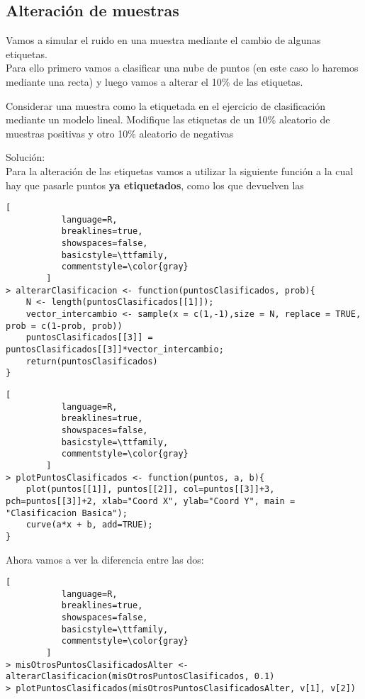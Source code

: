 \documentclass[11pt,fleqn]{book} %
\begin{document}
\subsection{Alteración de muestras}
Vamos a simular el ruido en una muestra mediante el cambio de algunas etiquetas.\\
Para ello primero vamos a clasificar una nube de puntos (en este caso lo haremos mediante una recta) y luego vamos a alterar el 10\% de las etiquetas.\\

\begin{exercise}
Considerar una muestra como la etiquetada en el ejercicio de clasificación mediante un modelo lineal. Modifique las etiquetas de un 10\% aleatorio de muestras positivas y otro 10\% aleatorio de negativas
\end{exercise}
Solución:\\
Para la alteración de las etiquetas vamos a utilizar la siguiente función a la cual hay que pasarle puntos \textbf{ya etiquetados}, como los que devuelven las 
\begin{lstlisting}[
           language=R,
           breaklines=true,
           showspaces=false,
           basicstyle=\ttfamily,
           commentstyle=\color{gray}
        ]
> alterarClasificacion <- function(puntosClasificados, prob){
    N <- length(puntosClasificados[[1]]);
    vector_intercambio <- sample(x = c(1,-1),size = N, replace = TRUE, prob = c(1-prob, prob))
    puntosClasificados[[3]] = puntosClasificados[[3]]*vector_intercambio;
    return(puntosClasificados)
}
\end{lstlisting}

\begin{lstlisting}[
           language=R,
           breaklines=true,
           showspaces=false,
           basicstyle=\ttfamily,
           commentstyle=\color{gray}
        ]
> plotPuntosClasificados <- function(puntos, a, b){
    plot(puntos[[1]], puntos[[2]], col=puntos[[3]]+3, pch=puntos[[3]]+2, xlab="Coord X", ylab="Coord Y", main = "Clasificacion Basica");
    curve(a*x + b, add=TRUE);
}
\end{lstlisting}

Ahora vamos a ver la diferencia entre las dos:\\

\begin{lstlisting}[
           language=R,
           breaklines=true,
           showspaces=false,
           basicstyle=\ttfamily,
           commentstyle=\color{gray}
        ]
> misOtrosPuntosClasificadosAlter <- alterarClasificacion(misOtrosPuntosClasificados, 0.1)
> plotPuntosClasificados(misOtrosPuntosClasificadosAlter, v[1], v[2])
\end{lstlisting}
\end{document}

